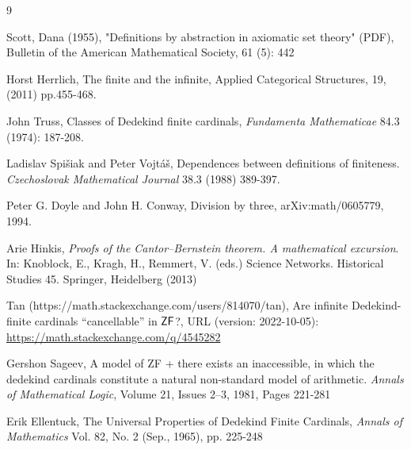 \documentclass{amsart}
\newcommand{\1}{\ensuremath{\mathds{1}}}
\theoremstyle{plain}
\theoremstyle{boldrk}
\theoremstyle{definition}
\begin{document}
\begin{thebibliography}{9}

Scott, Dana (1955), "Definitions by abstraction in axiomatic set theory" (PDF), Bulletin of the American Mathematical Society, 61 (5): 442

Horst Herrlich, The finite and the infinite, Applied Categorical Structures, 19, (2011) pp.455-468.

John Truss, Classes of Dedekind finite cardinals, \emph{Fundamenta Mathematicae} 84.3 (1974): 187-208.

Ladislav Spišiak and Peter Vojtáš, Dependences between definitions of finiteness. \emph{Czechoslovak Mathematical Journal} 38.3 (1988) 389-397.

Peter G. Doyle and John H. Conway, Division by three, arXiv:math/0605779, 1994.

Arie Hinkis, \emph{Proofs of the Cantor–Bernstein theorem. A mathematical excursion}. In: Knoblock, E., Kragh, H., Remmert, V. (eds.) Science Networks. Historical Studies 45. Springer, Heidelberg (2013)

Tan (https://math.stackexchange.com/users/814070/tan), Are infinite Dedekind-finite cardinals “cancellable” in $\sf ZF$?, URL (version: 2022-10-05): \url{https://math.stackexchange.com/q/4545282}

Gershon Sageev, A model of ZF + there exists an inaccessible, in which the dedekind cardinals constitute a natural non-standard model of arithmetic. \emph{Annals of Mathematical Logic},
Volume 21, Issues 2–3,
1981,
Pages 221-281

Erik Ellentuck, The Universal Properties of Dedekind Finite Cardinals, \emph{Annals of Mathematics} Vol. 82, No. 2 (Sep., 1965), pp. 225-248

\end{thebibliography}
\end{document}
